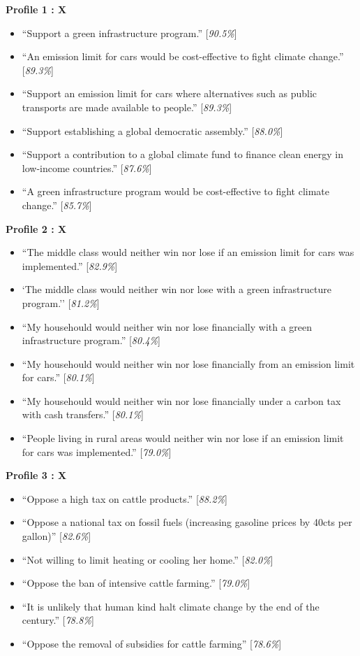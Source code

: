 \documentclass{article}
\begin{document}
\textbf{Profile 1 : X}
\begin{itemize}
\item ``Support a green infrastructure program.'' [\textit{90.5\%}]
\item ``An emission limit for cars would be cost-effective to fight climate change.'' [\textit{89.3\%}]
\item ``Support an emission limit for cars where alternatives such as public transports are made available to people.'' [\textit{89.3\%}]
\item ``Support establishing a global democratic assembly.'' [\textit{88.0\%}]
\item ``Support a contribution to a global climate fund to finance clean energy in low-income countries.'' [\textit{87.6\%}]
\item ``A green infrastructure program would be cost-effective to fight climate change.'' [\textit{85.7\%}]
\end{itemize}


\textbf{Profile 2 : X}
\begin{itemize}
\item ``The middle class would neither win nor lose if an emission limit for cars was implemented.'' [\textit{82.9\%}] 
\item `The middle class would neither win nor lose with a green infrastructure program.'' [\textit{81.2\%}]
\item ``My househould would neither win nor lose financially with a green infrastructure program.'' [\textit{80.4\%}]
\item ``My househould would neither win nor lose financially from an emission limit for cars.'' [\textit{80.1\%}]
\item ``My househould would neither win nor lose financially under a carbon tax with cash transfers.'' [\textit{80.1\%}]
\item ``People living in rural areas would neither win nor lose if an emission limit for cars was implemented.'' [\textit{79.0\%}]
\end{itemize}

\textbf{Profile 3 : X}
\begin{itemize}
\item ``Oppose a high tax on cattle products.'' [\textit{88.2\%}]
\item ``Oppose a national tax on fossil fuels (increasing gasoline prices by 40cts per gallon)'' [\textit{82.6\%}]
\item ``Not willing to limit heating or cooling her home.'' [\textit{82.0\%}]
\item ``Oppose the ban of intensive cattle farming.'' [\textit{79.0\%}]
\item ``It is unlikely that human kind halt climate change by the end of the century.'' [\textit{78.8\%}]
\item ``Oppose the removal of subsidies for cattle farming'' [\textit{78.6\%}]
\end{itemize}
\end{document}
